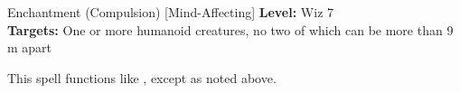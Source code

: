 {Enchantment (Compulsion) [Mind-Affecting]}
{
	\textbf{Level:}
	Wiz 7\\
	\textbf{Targets:}
	One or more humanoid creatures, no two of which can be more than 9 m apart\\
}
{
	This spell functions like , except as noted above.

}
